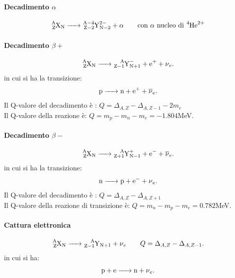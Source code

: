 \paragraph{Decadimento $\alpha$}
\[
	\ce{ \ce{^{A}_{Z}X_{N}} -> \ce{^{A-4}_{Z-2}Y^{2-}_{N-2} + \alpha}} \quad \quad \text{con $\alpha$ nucleo di  \ce{^{4}_{}He^{2+}_{}}}
\]
\paragraph{Decadimento $\beta+$}
\[
	\ce{\ce{^{A}_{Z}X_{N}} -> \ce{^{A}_{Z-1}Y^{-}_{N+1}} + e^{+} + \nu_{e} }
.\]
in cui si ha la transizione:
\[
	\ce{p -> n + e^+ + \overline{\nu}_e}
.\]
Il Q-valore del decadimento è : $Q = \Delta_{A,Z} - \Delta_{A, Z-1} - 2m_e $\\
Il Q-valore della reazione è: $ Q = m_p - m_n - m_e = - 1.804 $MeV.

\paragraph{Decadimento $\beta-$}
\[
	\ce{\ce{^{A}_{Z}X_{N}} -> \ce{^{A}_{Z+1}Y^{+}_{N-1}} + e^{-} + \overline{\nu}_{e} }
.\]
in cui si ha la transizione:
\[
	\ce{n -> p + e^- + \nu_e}
.\]
Il Q-valore del decadimento è : $Q = \Delta_{A,Z} - \Delta_{A, Z+1} $\\
Il Q-valore della reazione di transizione è: $ Q = m_n - m_p - m_e = 0.782 $MeV.
\paragraph{Cattura elettronica}
\[
	\ce{\ce{^{A}_{Z}X_{N}} -> \ce{^{A}_{Z-1}Y_{N+1}} + \nu_e} \quad \quad Q = \Delta_{A,Z} - \Delta_{A, Z-1} 
.\] 
in cui si ha:
\[
\ce{p + e ->n + \nu_e }
.\] 

